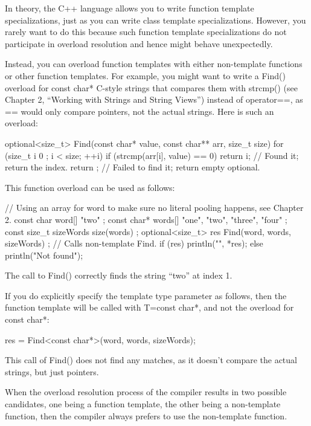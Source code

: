 
In theory, the C++ language allows you to write function template specializations, just as you can write class template specializations. However, you rarely want to do this because such function template specializations do not participate in overload resolution and hence might behave unexpectedly.

Instead, you can overload function templates with either non-template functions or other function templates. For example, you might want to write a Find() overload for const char* C-style strings that compares them with strcmp() (see Chapter 2, “Working with Strings and String Views”) instead of operator==, as == would only compare pointers, not the actual strings. Here is such an overload:

\begin{cpp}
optional<size_t> Find(const char* value, const char** arr, size_t size)
{
    for (size_t i { 0 }; i < size; ++i) {
        if (strcmp(arr[i], value) == 0) {
            return i; // Found it; return the index.
        }
    }
    return {}; // Failed to find it; return empty optional.
}
\end{cpp}

This function overload can be used as follows:

\begin{cpp}
// Using an array for word to make sure no literal pooling happens, see Chapter 2.
const char word[] { "two" };
const char* words[] { "one", "two", "three", "four" };
const size_t sizeWords { size(words) };
optional<size_t> res { Find(word, words, sizeWords) }; // Calls non-template Find.
if (res) { println("{}", *res); }
else { println("Not found"); }
\end{cpp}

The call to Find() correctly finds the string “two” at index 1.

If you do explicitly specify the template type parameter as follows, then the function template will be called with T=const char*, and not the overload for const char*:

\begin{cpp}
res = Find<const char*>(word, words, sizeWords);
\end{cpp}

This call of Find() does not find any matches, as it doesn’t compare the actual strings, but just pointers.

When the overload resolution process of the compiler results in two possible candidates, one being a function template, the other being a non-template function, then the compiler always prefers to use the non-template function.

